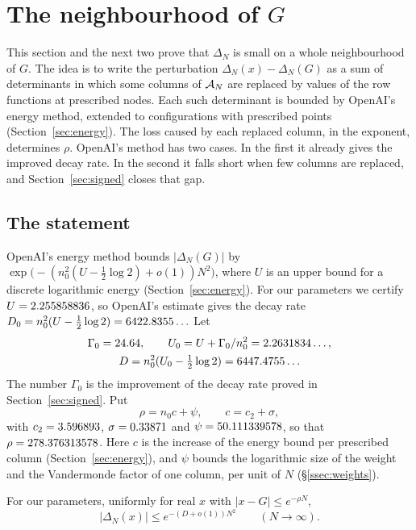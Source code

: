 \section{The neighbourhood of $G$}\label{sec:real}

This section and the next two prove that $\Delta_N$ is small on a whole neighbourhood of $G$. The idea is to
write the perturbation $\Delta_N(x)-\Delta_N(G)$ as a sum of determinants in which some columns of $\mathcal A_N$
are replaced by values of the row functions at prescribed nodes. Each such determinant is bounded by
OpenAI's energy method, extended to configurations with prescribed points (Section~\ref{sec:energy}). The
loss caused by each replaced column, in the exponent, determines $\rho$. OpenAI's method has two cases. In
the first it already gives the improved decay rate. In the second it falls short when few columns are
replaced, and Section~\ref{sec:signed} closes that gap.

\subsection{The statement}
OpenAI's energy method bounds $|\Delta_N(G)|$ by $\exp\bigl(-(n_0^2(U-\frac12\log2)+o(1))N^2\bigr)$, where $U$
is an upper bound for a discrete logarithmic energy (Section~\ref{sec:energy}). For our parameters we
certify $U=2.255858836$, so OpenAI's estimate gives the decay rate $D_0=n_0^2(U-\frac12\log2)=6422.8355\ldots$
Let
\begin{gather*}
 \Gamma_0=24.64,\qquad U_0=U+\Gamma_0/n_0^2=2.2631834\ldots,\\
 D=n_0^2(U_0-\tfrac12\log2)=6447.4755\ldots
\end{gather*}
The number $\Gamma_0$ is the improvement of the decay rate proved in Section~\ref{sec:signed}. Put
\begin{equation}\label{eq:rho-def}
 \rho=n_0c+\psi,\qquad c=c_2+\sigma,
\end{equation}
with $c_2=3.596893$, $\sigma=0.33871$ and $\psi=50.111339578$,
so that $\rho=278.376313578$. Here $c$ is the increase of the energy bound per prescribed column
(Section~\ref{sec:energy}), and $\psi$ bounds the logarithmic size of the weight and the Vandermonde factor
of one column, per unit of $N$ (\S\ref{ssec:weights}).

\begin{theorem}\label{thm:real}
For our parameters, uniformly for real $x$ with $|x-G|\le e^{-\rho N}$,
\[
 |\Delta_N(x)|\le e^{-(D+o(1))N^2}\qquad(N\to\infty).
\]
\end{theorem}

